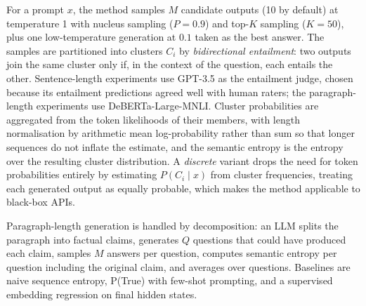 For a prompt $x$, the method samples $M$ candidate outputs (10 by default) at temperature 1 with nucleus sampling ($P=0.9$) and top-$K$ sampling ($K=50$), plus one low-temperature generation at $0.1$ taken as the best answer. The samples are partitioned into clusters $C_i$ by \emph{bidirectional entailment}: two outputs join the same cluster only if, in the context of the question, each entails the other. Sentence-length experiments use GPT-3.5 as the entailment judge, chosen because its entailment predictions agreed well with human raters; the paragraph-length experiments use DeBERTa-Large-MNLI. Cluster probabilities are aggregated from the token likelihoods of their members, with length normalisation by arithmetic mean log-probability rather than sum so that longer sequences do not inflate the estimate, and the semantic entropy is the entropy over the resulting cluster distribution. A \emph{discrete} variant drops the need for token probabilities entirely by estimating $P(C_i \mid x)$ from cluster frequencies, treating each generated output as equally probable, which makes the method applicable to black-box APIs.

\begin{center}
\end{center}

Paragraph-length generation is handled by decomposition: an LLM splits the paragraph into factual claims, generates $Q$ questions that could have produced each claim, samples $M$ answers per question, computes semantic entropy per question including the original claim, and averages over questions. Baselines are naive sequence entropy, P(True) with few-shot prompting, and a supervised embedding regression on final hidden states.


